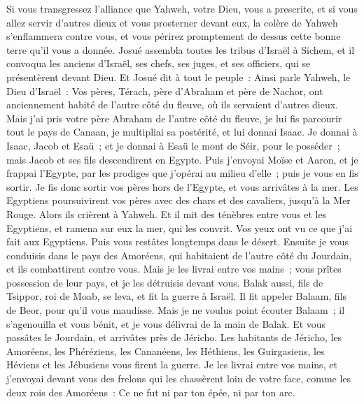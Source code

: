 \begin{multicols}{2}
Si vous transgressez l'alliance que Yahweh, votre Dieu, vous a prescrite, et si vous allez servir d'autres dieux et vous prosterner devant eux, la colère de Yahweh s'enflammera contre vous, et vous périrez promptement de dessus cette bonne terre qu'il vous a donnée.
\VerseOne{}Josué assembla toutes les tribus d'Israël à Sichem, et il convoqua les anciens d'Israël, ses chefs, ses juges, et ses officiers, qui se présentèrent devant Dieu.
Et Josué dit à tout le peuple~: Ainsi parle Yahweh, le Dieu d'Israël~: Vos pères, Térach, père d'Abraham et père de Nachor, ont anciennement habité de l'autre côté du fleuve, où ils servaient d'autres dieux.
Mais j'ai pris votre père Abraham de l'autre côté du fleuve, je lui fis parcourir tout le pays de Canaan, je multipliai sa postérité, et lui donnai Isaac.
Je donnai à Isaac, Jacob et Esaü~; et je donnai à Esaü le mont de Séir, pour le posséder~; mais Jacob et ses fils descendirent en Egypte.
Puis j'envoyai Moïse et Aaron, et je frappai l'Egypte, par les prodiges que j'opérai au milieu d'elle~; puis je vous en fis sortir.
Je fis donc sortir vos pères hors de l'Egypte, et vous arrivâtes à la mer. Les Egyptiens poursuivirent vos pères avec des chars et des cavaliers, jusqu'à la Mer Rouge.
Alors ils crièrent à Yahweh. Et il mit des ténèbres entre vous et les Egyptiens, et ramena sur eux la mer, qui les couvrit. Vos yeux ont vu ce que j'ai fait aux Egyptiens. Puis vous restâtes longtemps dans le désert.
Ensuite je vous conduisis dans le pays des Amoréens, qui habitaient de l'autre côté du Jourdain, et ils combattirent contre vous. Mais je les livrai entre vos mains~; vous prîtes possession de leur pays, et je les détruisis devant vous.
Balak aussi, fils de Tsippor, roi de Moab, se leva, et fit la guerre à Israël. Il fit appeler Balaam, fils de Beor, pour qu'il vous maudisse.
Mais je ne voulus point écouter Balaam~; il s'agenouilla et vous bénit, et je vous délivrai de la main de Balak.
Et vous passâtes le Jourdain, et arrivâtes près de Jéricho. Les habitants de Jéricho, les Amoréens, les Phéréziens, les Cananéens, les Héthiens, les Guirgasiens, les Héviens et les Jébusiens vous firent la guerre. Je les livrai entre vos mains,
et j'envoyai devant vous des frelons qui les chassèrent loin de votre face, comme les deux rois des Amoréens~: Ce ne fut ni par ton épée, ni par ton arc.

\end{multicols}
